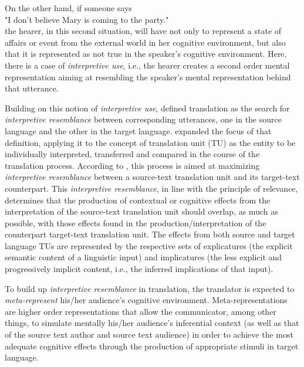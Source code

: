\documentclass[output=paper]{langsci/langscibook}
\begin{document}
On the other hand, if someone says\\

"I don’t believe Mary is coming to the party."\\

the hearer, in this second situation, will have not only to represent a state of affairs or event from the external world in her cognitive environment, but also that it is represented as not true in the speaker’s cognitive environment. Here, there is a case of \textit{interpretive use}, i.e., the hearer creates a second order mental representation aiming at resembling the speaker’s mental representation behind that utterance. 


Building on this notion of \textit{interpretive use}, \citet{Gutt1991} defined translation as the search for \textit{interpretive resemblance }between corresponding utterances, one in the source language and the other in the target language. \citet{Goncalves2003} expanded the focus of that definition, applying it to the concept of translation unit (TU) as the entity to be individually interpreted, transferred and compared in the course of the translation process. According to \citet{Goncalves2003}, this process is aimed at maximizing \textit{interpretive resemblance }between a source-text translation unit and its target-text counterpart. This \textit{interpretive resemblance}, in line with the principle of relevance, determines that the production of contextual or cognitive effects from the interpretation of the source-text translation unit should overlap, as much as possible, with those effects found in the production/interpretation of the counterpart target-text translation unit. The effects from both source and target language TUs are represented by the respective sets of explicatures (the explicit semantic content of a linguistic input) and implicatures (the less explicit and progressively implicit content, i.e., the inferred implications of that input).



To build up \textit{interpretive resemblance} in translation, the translator is expected to \textit{meta-represent} his/her audience’s cognitive environment. Meta-representations are higher order representations that allow the communicator, among other things, to simulate mentally his/her audience’s inferential context (as well as that of the source text author and source text audience) in order to achieve the most adequate cognitive effects through the production of appropriate stimuli in target language.  
\end{document}
